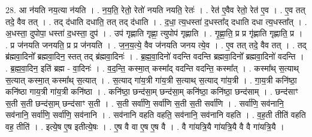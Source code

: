 \documentclass[17pt]{extarticle}
\begin{document}
28. आ न॑यति नय॒त्या न॑यति । . न॒य॒ति॒ रेतो॒ रेतो॑ नयति नयति॒ रेतः॑ । . रेत॑ ए॒वैव रेतो॒ रेत॑ ए॒व । . ए॒व तत् तदे॒ वैव तत् । . तद् द॑धाति दधाति॒ तत् तद् द॑धाति । . द॒धा॒ त्य॒धस्ता॑ द॒धस्ता᳚द् दधाति दधा त्य॒धस्ता᳚त् । . अ॒धस्ता॒ दुपोपा॒ धस्ता॑ द॒धस्ता॒ दुप॑ । . उप॑ गृह्णाति गृह्णा॒ त्युपोप॑ गृह्णाति । . गृ॒ह्णा॒ति॒ प्र प्र गृ॑ह्णाति गृह्णाति॒ प्र । . प्र ज॑नयति जनयति॒ प्र प्र ज॑नयति । . ज॒न॒य॒त्ये॒ वैव ज॑नयति जनय त्ये॒व । . ए॒व तत् तदे॒ वैव तत् । . तद् ब्र॑ह्मवा॒दिनो᳚ ब्रह्मवा॒दिन॒ स्तत् तद् ब्र॑ह्मवा॒दिनः॑ । . ब्र॒ह्म॒वा॒दिनो॑ वदन्ति वदन्ति ब्रह्मवा॒दिनो᳚ ब्रह्मवा॒दिनो॑ वदन्ति । . ब्र॒ह्म॒वा॒दिन॒ इति॑ ब्रह्म - वा॒दिनः॑ । . व॒द॒न्ति॒ कस्मा॒त् कस्मा᳚द् वदन्ति वदन्ति॒ कस्मा᳚त् । . कस्मा᳚थ् स॒त्याथ् स॒त्यात् कस्मा॒त् कस्मा᳚थ् स॒त्यात् । . स॒त्याद् गा॑य॒त्री गा॑य॒त्री स॒त्याथ् स॒त्याद् गा॑य॒त्री । . गा॒य॒त्री कनि॑ष्ठा॒ कनि॑ष्ठा गाय॒त्री गा॑य॒त्री कनि॑ष्ठा । . कनि॑ष्ठा॒ छन्द॑सा॒म् छन्द॑सा॒म् कनि॑ष्ठा॒ कनि॑ष्ठा॒ छन्द॑साम् । . छन्द॑साꣳ स॒ती स॒ती छन्द॑सा॒म् छन्द॑साꣳ स॒ती । . स॒ती सर्वा॑णि॒ सर्वा॑णि स॒ती स॒ती सर्वा॑णि । . सर्वा॑णि॒ सव॑नानि॒ सव॑नानि॒ सर्वा॑णि॒ सर्वा॑णि॒ सव॑नानि । . सव॑नानि वहति वहति॒ सव॑नानि॒ सव॑नानि वहति । . व॒ह॒ती तीति॑ वहति वह॒ तीति॑ । . इत्ये॒ष ए॒ष इतीत्ये॒षः । . ए॒ष वै वा ए॒ष ए॒ष वै । . वै गा॑यत्रि॒यै गा॑यत्रि॒यै वै वै गा॑यत्रि॒यै । \newline
\end{document}
